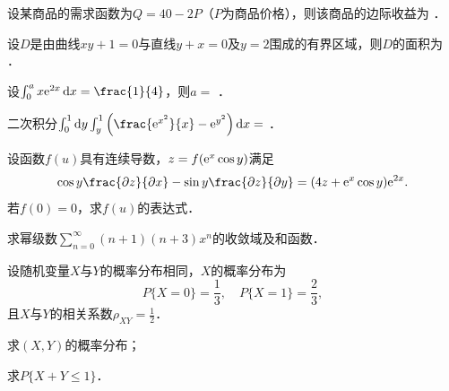 \documentclass[plain,noanswer,medmath]{../../template/jnuexam}
\begin{document}
\begin{problem}
设某商品的需求函数为$Q = 40 - 2P$（$P$为商品价格），则该商品的边际收益为 \fillin{}．
\end{problem}


\begin{problem}
设$D$是由曲线$xy + 1 = 0$与直线$y + x = 0$及$y = 2$围成的有界区域，则$D$的面积为 \fillin{}．
\end{problem}


\begin{problem}
设$\int_0^a x\e^{2x} \dx = \frac{1}{4}$，则$a =$ \fillin{}．
\end{problem}


\begin{problem}
二次积分$\int_0^1 \dy \int_y^1 \left(\frac{\e^{x^2}}{x} - \e^{y^2} \right)\dx =$ \fillin{}．
\end{problem}












\begin{problem}[points=10]%
设函数$f(u)$具有连续导数，$z = f(\mathrm{e}^x\cos y)$满足
$$\cos y\frac{\pdz}{\pdx} - \sin y\frac{\pdz}{\pdy} = (4z + \e^x\cos y) \e^{2x}.$$
若$f(0) = 0$，求$f(u)$的表达式．
\end{problem}


\begin{problem}[points=10]
求幂级数$\sum_{n = 0}^{\infty}(n + 1)(n + 3)x^n$的收敛域及和函数．
\end{problem}










\begin{problem}[points=11]
设随机变量$X$与$Y$的概率分布相同，$X$的概率分布为
$$P\{X = 0\} = \frac{1}{3},\quad P\{X = 1\} = \frac{2}{3},$$
且$X$与$Y$的相关系数$\rho_{XY} = \frac{1}{2}$．\par
\begin{enumerate*}
\item 求$(X,Y)$的概率分布；
\item 求$P\{X + Y \le 1\}$．
\end{enumerate*}
\end{problem}
\end{document}
